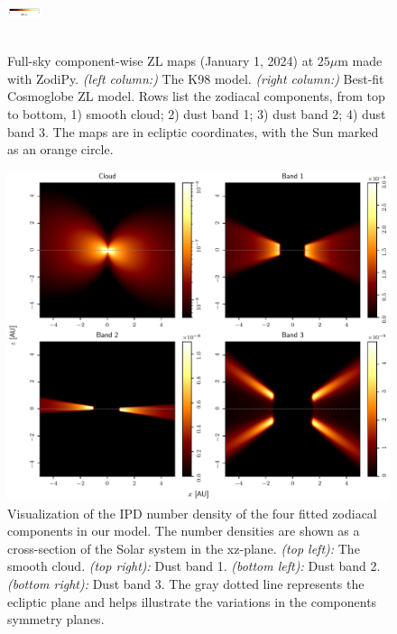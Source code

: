 \documentclass[twocolumn]{aa}
\begin{document}
\begin{figure}
{    \includegraphics[width=1cm,angle=90]{figs/comp_maps/cbar_2_inst.pdf}%
    }\\
    \\
    \caption{Full-sky component-wise ZL maps (January 1, 2024) at $25\mu$m made with ZodiPy. 
    \textit{(left column:)} The K98 model. \textit{(right column:)} Best-fit Cosmoglobe ZL model. 
    Rows list the zodiacal components, from top to bottom, 1) smooth cloud; 2) dust band 1; 3) 
    dust band 2; 4) dust band 3. The maps are in ecliptic coordinates, with the Sun marked as 
    an orange circle.}
    \label{fig:mission-averaged-inst-maps}
\end{figure}

\begin{figure}
    \centering
    \includegraphics[width=\textwidth]{figs/number_density.pdf}
    \caption{Visualization of the IPD number density of the four fitted zodiacal components in our model. The number densities are shown as a cross-section of the Solar system in the xz-plane. \textit{(top left):} The smooth cloud. \textit{(top right):} Dust band 1. \textit{(bottom left):} Dust band 2. \textit{(bottom right):} Dust band 3. The gray dotted line represents the ecliptic plane and helps illustrate the variations in the components symmetry planes.}
    \label{fig:ipd-number-density}
\end{figure}
\end{document}

